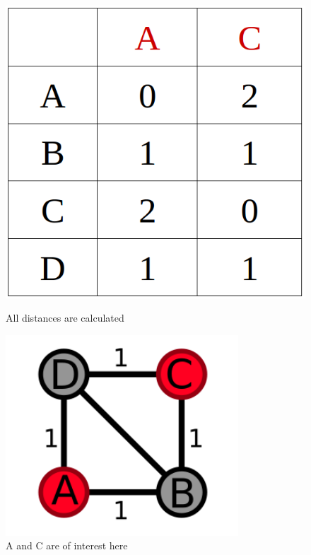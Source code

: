 \begin{figure}[h]
	\centering
	\begin{minipage}[b]{0.56\textwidth}
		\includegraphics[width=\textwidth]{figures/distanceTableWithoutCanceldist.png}
		\caption{All distances are calculated}
	\end{minipage}
	\hfill
	\begin{minipage}[b]{0.36\textwidth}
		\includegraphics[width=\textwidth]{figures/meshSCDC.png}
		\caption{A and C are of interest here}
	\end{minipage}
\end{figure}

